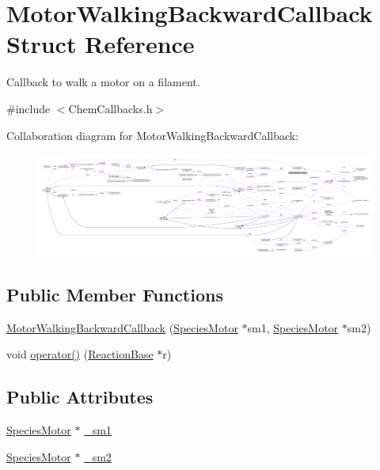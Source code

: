 \hypertarget{structMotorWalkingBackwardCallback}{\section{Motor\+Walking\+Backward\+Callback Struct Reference}
\label{structMotorWalkingBackwardCallback}
}


Callback to walk a motor on a filament.  




{\ttfamily \#include $<$Chem\+Callbacks.\+h$>$}



Collaboration diagram for Motor\+Walking\+Backward\+Callback\+:\nopagebreak
\begin{figure}[H]
\begin{center}
\leavevmode
\includegraphics[width=350pt]{structMotorWalkingBackwardCallback__coll__graph}
\end{center}
\end{figure}
\subsection*{Public Member Functions}
\begin{DoxyCompactItemize}
\item 
\hyperlink{structMotorWalkingBackwardCallback_a3e45e7643e7ca83c54937a05f77159bd}{Motor\+Walking\+Backward\+Callback} (\hyperlink{classSpeciesMotor}{Species\+Motor} $\ast$sm1, \hyperlink{classSpeciesMotor}{Species\+Motor} $\ast$sm2)
\item 
void \hyperlink{structMotorWalkingBackwardCallback_a02e519a23fde96e9cc408bef3da2efb0}{operator()} (\hyperlink{classReactionBase}{Reaction\+Base} $\ast$r)
\end{DoxyCompactItemize}
\subsection*{Public Attributes}
\begin{DoxyCompactItemize}
\item 
\hyperlink{classSpeciesMotor}{Species\+Motor} $\ast$ \hyperlink{structMotorWalkingBackwardCallback_a319a8ea51cf864c8dddeafeb6356af34}{\+\_\+sm1}
\item 
\hyperlink{classSpeciesMotor}{Species\+Motor} $\ast$ \hyperlink{structMotorWalkingBackwardCallback_ac19bf18556502e7eda1b89d28b36236e}{\+\_\+sm2}
\end{DoxyCompactItemize}


